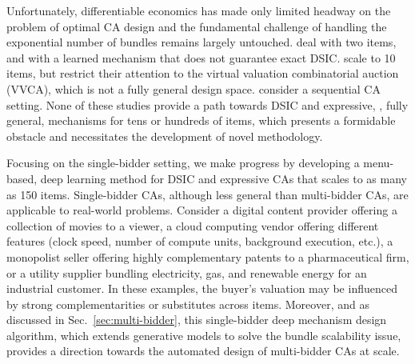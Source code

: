 Unfortunately, differentiable economics has made only limited headway on the problem of optimal CA design and the fundamental challenge of handling the exponential number of bundles remains largely untouched. \citet{dutting2024optimal} deal with two items, and with a learned mechanism that does not guarantee exact DSIC. \citet{duan2024scalable} scale to 10 items, but restrict their attention to  the virtual valuation combinatorial auction (VVCA), which is not a fully general design space. \citet{ravindranath2024deep} consider a sequential CA setting. None of these studies provide a path towards DSIC and expressive, \ie, fully general, mechanisms for tens or hundreds of items, 
which presents a formidable obstacle and necessitates the development of novel methodology.
%

Focusing on the single-bidder setting, we make progress by developing a menu-based, deep learning method for DSIC and expressive CAs that scales to as many as 
150 items.   Single-bidder CAs, although less general than multi-bidder CAs, are applicable to  real-world problems. Consider  a digital content provider offering a collection of movies to a viewer, a cloud computing vendor offering different features (clock speed, number of compute units,  background execution, etc.), a monopolist seller offering  highly complementary patents to a  pharmaceutical firm, or a utility  supplier bundling electricity, gas, and renewable energy for an industrial customer. In these examples, the buyer's valuation may be influenced by strong complementarities or substitutes across items.
Moreover, and as discussed in Sec.~\ref{sec:multi-bidder}, 
this single-bidder deep mechanism design algorithm, which extends generative models to solve
the bundle scalability issue, provides a 
direction towards the automated design of multi-bidder CAs at scale.


